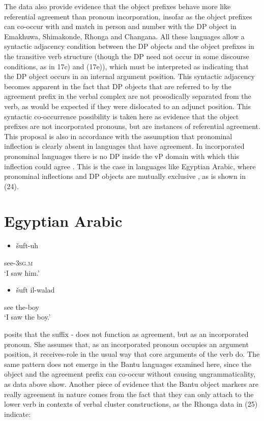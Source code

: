 \documentclass[output=paper]{langsci/langscibook}
\begin{document}
The data also provide evidence that the object prefixes behave more like referential agreement than pronoun incorporation, insofar as the object prefixes can co-occur with and match in person and number with the DP object in Emakhuwa, Shimakonde, Rhonga and Changana. All these languages allow a syntactic adjacency condition between the DP objects and the object prefixes in the transitive verb structure (though the DP need not occur in some discourse conditions, as in 17c) and (17e)), which must be interpreted as indicating that the DP object occurs in an internal argument position. This syntactic adjacency becomes apparent in the fact that DP objects that are referred to by the agreement prefix in the verbal complex are not prosodically separated from the verb, as would be expected if they were dislocated to an adjunct position. This syntactic co-occurrence possibility is taken here as evidence that the object prefixes are not incorporated pronouns, but are instances of referential agreement. This proposal is also in accordance with the assumption that pronominal inflection is clearly absent in languages that have agreement. In incorporated pronominal languages there is no DP inside the vP domain with which this inflection could agree \citep{Jelinek1989}. This is the case in languages like Egyptian Arabic, where pronominal inflections and DP objects are mutually exclusive \citep{Jelinek1989}, as is shown in (24).

\chapter[Egyptian Arabic]{Egyptian Arabic}
\label{bkm:Ref455885454}\setcounter{itemize}{0}
\begin{itemize}
\item \gll šuft-uh\\
\end{itemize}
     see-\textsc{3sg.m}\\
\glt ‘I saw him.’
\z

\begin{itemize}
\item \gll šuft           il-walad\\
\end{itemize}
     see           the-boy\\
\glt ‘I saw the boy.’
\z

\citet{Jelinek1989} posits that the suffix - does not function as agreement, but as an incorporated pronoun. She assumes that, as an incorporated pronoun occupies an argument position, it receives-role in the usual way that core arguments of the verb do. The same pattern does not emerge in the Bantu languages examined here, since the object and the agreement prefix can co-occur without causing ungrammaticality, as data above show. Another piece of evidence that the Bantu object markers are really agreement in nature comes from the fact that they can only attach to the lower verb in contexts of verbal cluster constructions, as the Rhonga data in (25) indicate:
\end{document}
